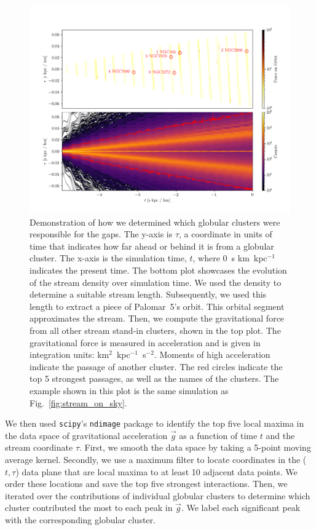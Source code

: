         \begin{figure}
            \centering
            \includegraphics[width=\linewidth]{images/force_on_orbit-monte-carlo-009.png}
            \caption{Demonstration of how we determined which globular clusters were responsible for the gaps. The y-axis is $\tau$, a coordinate in units of time that indicates how far ahead or behind it is from a globular cluster. The x-axis is the simulation time, $t$, where 0~s km~kpc$^{-1}$ indicates the present time. The bottom plot showcases the evolution of the stream density over simulation time. We used the density to determine a suitable stream length. Subsequently, we used this length to extract a piece of Palomar~5's orbit. This orbital segment approximates the stream. Then, we compute the gravitational force from all other stream stand-in clusters, shown in the top plot. The gravitational force is measured in acceleration and is given in integration units: km$^2$~kpc$^{-1}$~s$^{-2}$. Moments of high acceleration indicate the passage of another cluster. The red circles indicate the top 5 strongest passages, as well as the names of the clusters. The example shown in this plot is the same simulation as Fig.~\ref{fig:stream_on_sky}.}
            \label{fig:force-on-orbit}
        \end{figure}          
        
        We then used \texttt{scipy}'s \texttt{ndimage} \citep{2020NatMe..17..261V} package to identify the top five local maxima in the data space of gravitational acceleration $\vec{g}$ as a function of time $t$ and the stream coordinate $\tau$. First, we smooth the data space by taking a 5-point moving average kernel. Secondly, we use a maximum filter to locate coordinates in the ($t,\tau$) data plane that are local maxima to at least 10 adjacent data points. We order these locations and save the top five strongest interactions. Then, we iterated over the contributions of individual globular clusters to determine which cluster contributed the most to each peak in $\vec{g}$. We label each significant peak with the corresponding globular cluster.

